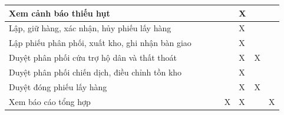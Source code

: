 \documentclass[12pt,a4paper,oneside]{report}
\begin{document}
\begin{table}[H]
\begin{tabularx}{\textwidth}{|Y|*{7}{>{\centering\arraybackslash}p{1.05cm}|}}
    \hline
    Xem cảnh báo thiếu hụt &  &  &  &  & X &  &  \\
    \hline
    Lập, giữ hàng, xác nhận, hủy phiếu lấy hàng &  &  &  &  & X &  &  \\
    \hline
    Lập phiếu phân phối, xuất kho, ghi nhận bàn giao &  &  &  &  & X &  &  \\
    \hline
    Duyệt phân phối cứu trợ hộ dân và thất thoát &  &  &  &  & X & X &  \\
    \hline
    Duyệt phân phối chiến dịch, điều chỉnh tồn kho &  &  &  &  & X &  &  \\
    \hline
    Duyệt đóng phiếu lấy hàng &  &  &  &  & X & X &  \\
    \hline
    Xem báo cáo tổng hợp &  &  &  & X & X &  & X \\
    \hline
  \end{tabularx}
\end{table}

\clearpage
\end{document}
